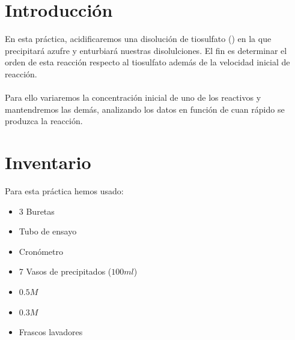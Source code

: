 \section{Introducción}
\noindent En esta práctica, acidificaremos una disolución de tiosulfato () en la que precipitará azufre y enturbiará nuestras disolulciones. El fin es determinar el orden de esta reacción respecto al tiosulfato además de la velocidad inicial de reacción.\\ \\
\noindent Para ello variaremos la concentración inicial de uno de los reactivos y mantendremos las demás, analizando los datos en función de cuan rápido se produzca la reacción.

\section{Inventario}
Para esta práctica hemos usado:

\begin{itemize}
    \item 3 Buretas
    \item Tubo de ensayo
    \item Cronómetro
    \item 7 Vasos de precipitados ($100ml$)
    \item {} $0.5M$
    \item {} $0.3M$
    \item Frascos lavadores
\end{itemize}

\vspace{0.8cm}

